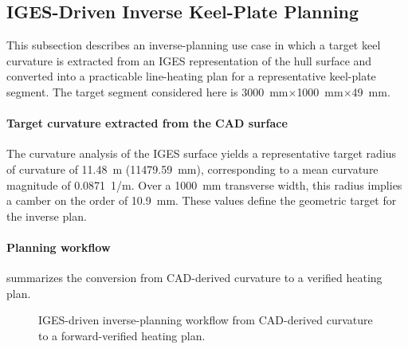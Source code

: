 \subsection{IGES-Driven Inverse Keel-Plate Planning}
\label{sec:iges-inverse}

This subsection describes an inverse-planning use case in which a target keel curvature is extracted from an IGES representation of the hull surface and converted into a practicable line-heating plan for a representative keel-plate segment. The target segment considered here is \SI{3000}{mm}$\times$\SI{1000}{mm}$\times$\SI{49}{mm}.

\paragraph{Target curvature extracted from the CAD surface}
The curvature analysis of the IGES surface yields a representative target radius of curvature of \SI{11.48}{m} (\SI{11479.59}{mm}), corresponding to a mean curvature magnitude of \SI{0.0871}{1/m}. Over a \SI{1000}{mm} transverse width, this radius implies a camber on the order of \SI{10.9}{mm}. These values define the geometric target for the inverse plan.

\paragraph{Planning workflow}
 summarizes the conversion from CAD-derived curvature to a verified heating plan.

\begin{figure}[H]
\centering
{}
\caption{IGES-driven inverse-planning workflow from CAD-derived curvature to a forward-verified heating plan.}
\label{fig:iges-inverse-flow}
\end{figure}

